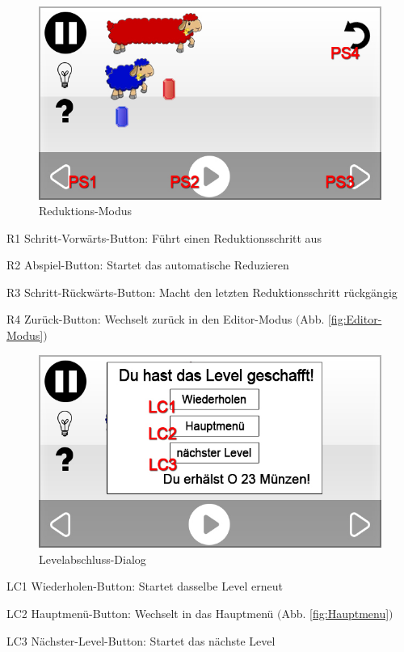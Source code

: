 
\begin{figure}[H]
\centering
\includegraphics[scale=0.55]{../gui/_jpeg_numeration/game_play_started.jpg}
\caption{Reduktions-Modus}
\label{fig:Reduktions-Modus}
\end{figure}
\begin{description*}
\item[R1] Schritt-Vorwärts-Button: Führt einen Reduktionsschritt aus
\item[R2] Abspiel-Button: Startet das automatische Reduzieren
\item[R3] Schritt-Rückwärts-Button: Macht den letzten Reduktionsschritt rückgängig
\item[R4] Zurück-Button: Wechselt zurück in den Editor-Modus $($Abb. \ref{fig:Editor-Modus}$)$
\end{description*}


\begin{figure}[H]
\centering
\includegraphics[scale=0.55]{../gui/_jpeg_numeration/game_completed.jpg}
\caption{Levelabschluss-Dialog}
\label{fig:Reduktions-Modus_Levelabschluss}
\end{figure}
\begin{description*}
\item[LC1] Wiederholen-Button: Startet dasselbe Level erneut
\item[LC2] Hauptmenü-Button: Wechselt in das Hauptmenü $($Abb. \ref{fig:Hauptmenu}$)$
\item[LC3] Nächster-Level-Button: Startet das nächste Level
\end{description*}

